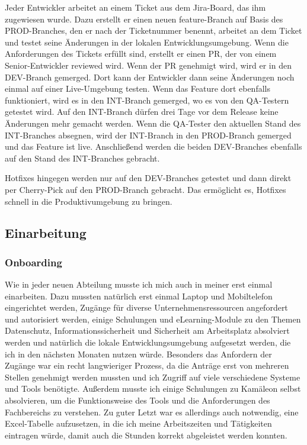 \documentclass[11pt, a4paper, oneside]{scrartcl}
\begin{document}
            Jeder Entwickler arbeitet an einem Ticket aus dem Jira-Board, das ihm zugewiesen wurde.
            Dazu erstellt er einen neuen feature-Branch auf Basis des PROD-Branches, den er nach der
            Ticketnummer benennt,
            arbeitet an dem Ticket und testet seine Änderungen in der lokalen Entwicklungsumgebung.
            Wenn die Anforderungen des Tickets erfüllt sind, erstellt er einen PR, der von einem
            Senior-Entwickler reviewed wird.
            Wenn der PR genehmigt wird, wird er in den DEV-Branch gemerged.
            Dort kann der Entwickler dann seine Änderungen noch einmal auf einer Live-Umgebung
            testen.
            Wenn das Feature dort ebenfalls funktioniert, wird es in den INT-Branch gemerged, wo es
            von den QA-Testern getestet wird.
            Auf den INT-Branch dürfen drei Tage vor dem Release keine Änderungen mehr gemacht
            werden.
            Wenn die QA-Tester den aktuellen Stand des INT-Branches absegnen,
            wird der INT-Branch in den PROD-Branch gemerged und das Feature ist live.
            Anschließend werden die beiden DEV-Branches ebenfalls auf den Stand des INT-Branches
            gebracht.\par
            Hotfixes hingegen werden nur auf den DEV-Branches getestet und dann direkt per
            Cherry-Pick auf den PROD-Branch gebracht.
            Das ermöglicht es, Hotfixes schnell in die Produktivumgebung zu bringen.

        \subsection{Einarbeitung}
            \subsubsection{Onboarding}
            Wie in jeder neuen Abteilung musste ich mich auch in meiner erst einmal einarbeiten.
            Dazu mussten natürlich erst einmal Laptop und Mobiltelefon eingerichtet werden,
            Zugänge für diverse Unternehmensressourcen angefordert und autorisiert werden,
            einige Schulungen und eLearning-Module zu den Themen Datenschutz, Informationssicherheit
            und Sicherheit am Arbeitsplatz absolviert werden und natürlich die lokale
            Entwicklungsumgebung aufgesetzt werden, die ich in den nächsten Monaten nutzen würde.
            Besonders das Anfordern der Zugänge war ein recht langwieriger Prozess,
            da die Anträge erst von mehreren Stellen genehmigt werden mussten und ich Zugriff auf
            viele verschiedene Systeme und Tools benötigte.
            Außerdem musste ich einige Schulungen zu Kamäleon selbst absolvieren,
            um die Funktionsweise des Tools und die Anforderungen des Fachbereichs zu verstehen.
            Zu guter Letzt war es allerdings auch notwendig, eine Excel-Tabelle aufzusetzen, in die
            ich meine Arbeitszeiten und Tätigkeiten eintragen würde, damit auch die Stunden korrekt
            abgeleistet werden konnten.
\end{document}
